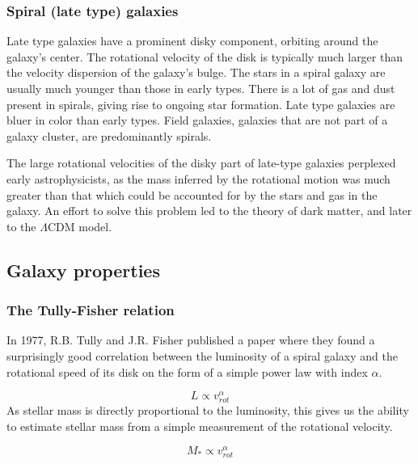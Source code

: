 \subsubsection{Spiral (late type) galaxies}
Late type galaxies have a prominent disky component, orbiting around the galaxy's center. The rotational velocity of the disk is typically much larger than the velocity dispersion of the galaxy's bulge. The stars in a spiral galaxy are usually much younger than those in early types. There is a lot of gas and dust present in spirals, giving rise to ongoing star formation. Late type galaxies are bluer in color than early types. Field galaxies, galaxies that are not part of a galaxy cluster, are predominantly spirals. 

The large rotational velocities of the disky part of late-type galaxies perplexed early astrophysicists, as the mass inferred by the rotational motion was much greater than that which could be accounted for by the stars and gas in the galaxy. An effort to solve this problem led to the theory of dark matter, and later to the $\Lambda$CDM model.


\subsection{Galaxy properties}


\subsubsection{The Tully-Fisher relation}

In 1977, R.B. Tully and J.R. Fisher \parencite{TullyFisher1977} published a paper where they found a surprisingly good correlation between the luminosity of a spiral galaxy and the rotational speed of its disk on the form of a simple power law with index $\alpha$.

\begin{equation}
    L \propto v_{rot}^\alpha
\end{equation}
As stellar mass is directly proportional to the luminosity, this gives us the ability to estimate stellar mass from a simple measurement of the rotational velocity.

\begin{equation}
    M_* \propto v_{rot}^\alpha 
\end{equation}


